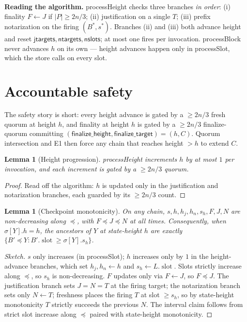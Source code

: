 \documentclass{article}
\newcommand{\slot}{\operatorname{\mathrm{slot}}}
\newcommand{\finalizeHeight}{\mathsf{finalize\_height}}
\newcommand{\finalizeTarget}{\mathsf{finalize\_target}}
\newcommand{\jtargets}{\mathsf{jtargets}}
\newcommand{\ntargets}{\mathsf{ntargets}}
\newcommand{\nslots}{\mathsf{nslots}}
\newcommand{\processSlot}{\textsf{processSlot}\xspace}
\newcommand{\processBlock}{\textsf{processBlock}\xspace}
\newcommand{\processHeight}{\textsf{processHeight}\xspace}
\theoremstyle{plain}
\newtheorem{lemma}[theorem]{Lemma}
\theoremstyle{definition}
\theoremstyle{remark}
\renewcommand{\paragraph}[1]{\vspace{6pt}\noindent\textbf{#1}}
\begin{document}
\paragraph{Reading the algorithm.} \processHeight checks three branches \emph{in order}: (i) finality $F \gets J$ if $|P| \geq 2n/3$; (ii) justification on a single $T$; (iii) prefix notarization on the firing $(B^*, s^*)$. Branches (ii) and (iii) both advance height and reset $\jtargets, \ntargets, \nslots$; at most one fires per invocation. \processBlock never advances $h$ on its own --- height advances happen only in \processSlot, which the store calls on every slot.

\section{Accountable safety}\label{sec:safety}

The safety story is short: every height advance is gated by a $\geq 2n/3$ fresh quorum at height $h$, and finality at height $h$ is gated by a $\geq 2n/3$ finalize-quorum committing $(\finalizeHeight, \finalizeTarget) = (h, C)$. Quorum intersection and E1 then force any chain that reaches height $> h$ to extend $C$.

\begin{lemma}[Height progression]\label{lem:heightprog}
\processHeight increments $h$ by at most $1$ per invocation, and each increment is gated by a $\geq 2n/3$ quorum.
\end{lemma}

\begin{proof}[Proof]
Read off the algorithm: $h$ is updated only in the justification and notarization branches, each guarded by its $\geq 2n/3$ count. \qedhere
\end{proof}

\begin{lemma}[Checkpoint monotonicity]\label{lem:slotmono}
On any chain, $s, h, h_j, h_n, s_h, F, J, N$ are non-decreasing along $\preceq$, with $F \preceq J \preceq N$ at all times. Consequently, when $\sigma[Y].h = h$, the ancestors of $Y$ at state-height $h$ are exactly $\{B' \preceq Y : B'.\slot \geq \sigma[Y].s_h\}$.
\end{lemma}

\begin{proof}[Sketch]
$s$ only increases (in \processSlot); $h$ increases only by $1$ in the height-advance branches, which set $h_j, h_n \gets h$ and $s_h \gets L.\slot$. Slots strictly increase along $\preceq$, so $s_h$ is non-decreasing. $F$ updates only via $F \gets J$, so $F \preceq J$. The justification branch sets $J = N = T$ at the firing target; the notarization branch sets only $N \gets T$; freshness places the firing $T$ at slot $\geq s_h$, so by state-height monotonicity $T$ strictly succeeds the previous $N$. The interval claim follows from strict slot increase along $\preceq$ paired with state-height monotonicity.
\end{proof}
\end{document}
